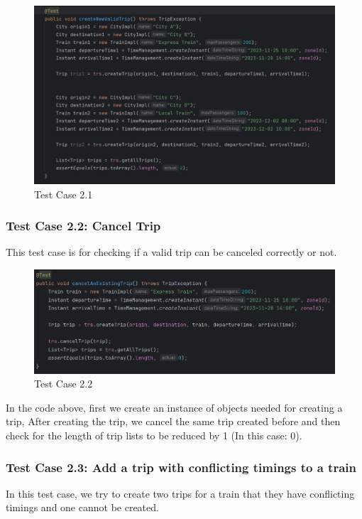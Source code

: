 \documentclass{article}
\begin{document}
\begin{figure}[h]
  \centering
  \includegraphics[width=1.0\textwidth]{pictures/T2-1.png}
  \caption{Test Case 2.1}
  \label{fig:your_label}
\end{figure}

\pagebreak

\subsubsection{Test Case 2.2: Cancel Trip}
This test case is for checking if a valid trip can be canceled correctly or not.

\begin{figure}[h]
  \centering
  \includegraphics[width=1.0\textwidth]{pictures/T2-2.png}
  \caption{Test Case 2.2}
  \label{fig:your_label}
\end{figure}

In the code above, first we create an instance of objects needed for creating a trip, After creating the trip, we cancel the same trip created before and then check for the length of trip lists to be reduced by 1 (In this case: 0).

\pagebreak

\subsubsection{Test Case 2.3: Add a trip with conflicting timings to a train}
In this test case, we try to create two trips for a train that they have conflicting timings and one cannot be created.
\end{document}
